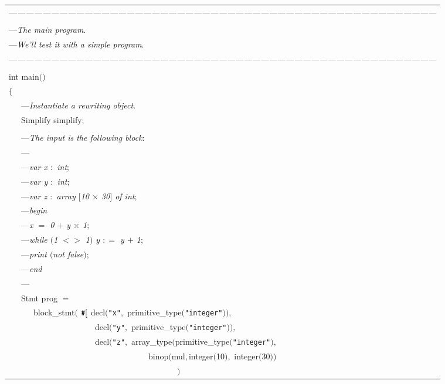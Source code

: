 {\CF\begin{tabular}{l}
---{\em ------------------------------------------------------------------------------------------------------------------------------------------------------}\\
\\
---{\em   The main program$.$}\\
---{\em   We'll test it with a simple program$.$}\\
---{\em ------------------------------------------------------------------------------------------------------------------------------------------------------}\\
\\
int main$($$)$\\
$\{$  \\
\ \ \ ---{\em  Instantiate a rewriting object$.$}\\
\ \ \ Simplify simplify$;$\\
\\
\ \ \ ---{\em  The input is the following block$:$}\\
\ \ \ ---{\em }\\
\ \ \ ---{\em   var x $:$ int$;$}\\
\ \ \ ---{\em   var y $:$ int$;$}\\
\ \ \ ---{\em   var z $:$ array $[$10 $\times$ 30$]$ of int$;$}\\
\ \ \ ---{\em   begin}\\
\ \ \ ---{\em      x $=$ 0 $+$ y $\times$ 1$;$}\\
\ \ \ ---{\em      while $($1 $<$$>$ 1$)$ y $:$$=$ y $+$ 1$;$}\\
\ \ \ ---{\em      print $($not false$)$$;$}\\
\ \ \ ---{\em   end}\\
\ \ \ ---{\em }\\
\ \ \ Stmt prog $=$ \\
\ \ \ \ \ \ block\_stmt$($ $\verb.#.[$ decl$($\verb."x".$,$ primitive\_type$($\verb."integer".$)$$)$$,$\\
\ \ \ \ \ \ \ \ \ \ \ \ \ \ \ \ \ \ \ \ \ decl$($\verb."y".$,$ primitive\_type$($\verb."integer".$)$$)$$,$\\
\ \ \ \ \ \ \ \ \ \ \ \ \ \ \ \ \ \ \ \ \ decl$($\verb."z".$,$ array\_type$($primitive\_type$($\verb."integer".$)$$,$\\
\ \ \ \ \ \ \ \ \ \ \ \ \ \ \ \ \ \ \ \ \ \ \ \ \ \ \ \ \ \ \ \ \ \ binop$($mul$,$integer$($10$)$$,$ integer$($30$)$$)$\\
\ \ \ \ \ \ \ \ \ \ \ \ \ \ \ \ \ \ \ \ \ \ \ \ \ \ \ \ \ \ \ \ \ \ \ \ \ \ \ \ \ $)$\\

\end{tabular}}
